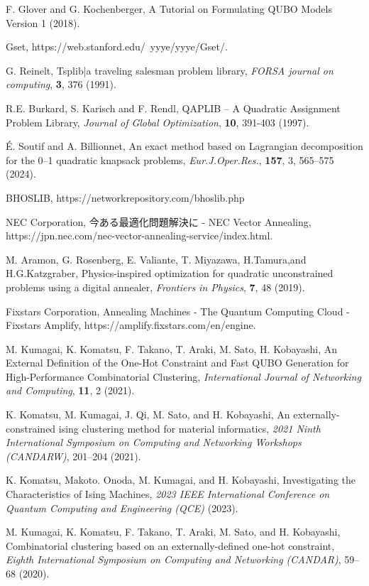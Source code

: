 \documentclass[submit,techrep,noauthor]{ipsj}
\begin{document}
\begin{thebibliography}{10}
F. Glover and G. Kochenberger, A Tutorial on Formulating QUBO Models Version 1 (2018).

Gset, https://web.stanford.edu/~yyye/yyye/Gset/.

G. Reinelt, Tsplib|a traveling salesman problem library, {\it FORSA journal on computing}, {\bf 3}, 376 (1991).

R.E. Burkard, S. Karisch and F. Rendl, QAPLIB – A Quadratic Assignment Problem Library, {\it Journal of Global Optimization}, {\bf 10}, 391-403 (1997).

É. Soutif and A. Billionnet, An exact method based on Lagrangian decomposition for the 0–1 quadratic knapsack problems, {\it Eur.J.Oper.Res.}, {\bf 157}, 3, 565–575 (2024).

BHOSLIB, https://networkrepository.com/bhoslib.php

NEC Corporation, 今ある最適化問題解決に - NEC Vector Annealing, https://jpn.nec.com/nec-vector-annealing-service/index.html.

M. Aramon, G. Rosenberg, E. Valiante, T. Miyazawa, H.Tamura,and H.G.Katzgraber, Physics-inspired optimization for quadratic unconstrained problems using a digital annealer, {\it Frontiers in Physics}, {\bf 7}, 48 (2019).

Fixstars Corporation, Annealing Machines - The Quantum Computing Cloud - Fixstars Amplify, https://amplify.fixstars.com/en/engine.

M. Kumagai, K. Komatsu, F. Takano, T. Araki, M. Sato, H. Kobayashi, An External Definition of the One-Hot Constraint and Fast QUBO Generation for High-Performance Combinatorial Clustering, {\it International Journal of Networking and Computing}, {\bf 11}, 2 (2021).

K. Komatsu, M. Kumagai, J. Qi, M. Sato, and H. Kobayashi, An externally-constrained ising clustering method for material informatics, {\it 2021 Ninth International Symposium on Computing and Networking Workshops (CANDARW)}, 201–204 (2021).

K. Komatsu, Makoto. Onoda, M. Kumagai, and H. Kobayashi, Investigating the Characteristics of Ising Machines, {\it 2023 IEEE International Conference on Quantum Computing and Engineering (QCE)} (2023).

M. Kumagai, K. Komatsu, F. Takano, T. Araki, M. Sato, and H. Kobayashi, Combinatorial clustering based on an externally-defined one-hot constraint, {\it Eighth International Symposium on Computing and Networking (CANDAR)}, 59–68 (2020).


\end{thebibliography}
\end{document}
